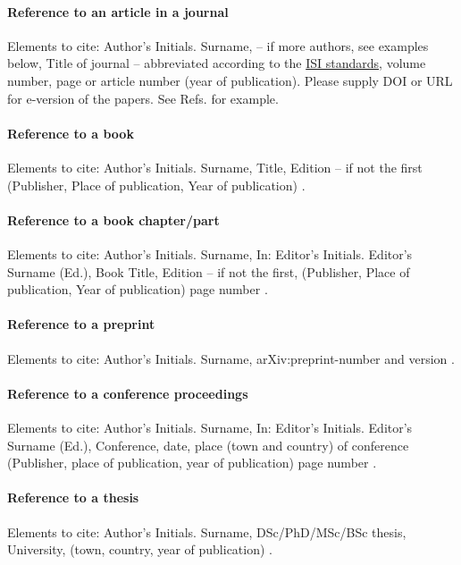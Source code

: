 \documentclass[CEJCS,PDF]{cej} %
\begin{document}
\paragraph{Reference to an article in a journal}
Elements to cite:
Author's Initials. Surname, -- if more authors, see examples below,
Title of journal -- abbreviated according to the \href{http://images.isiknowledge.com/WOK46/help/WOS/0-9_abrvjt.html}{ISI standards},
volume number, page or article number (year of publication).
Please supply DOI or URL for e-version of the papers.
See Refs. \cite{journal-1, journal-2, journal-3, journal-4, journal-5} for example.

\paragraph{Reference to a book}
Elements to cite:
Author's Initials. Surname,
Title,
Edition -- if not the first
(Publisher, Place of publication, Year of publication)
\cite{book-1, book-2}.


\paragraph{Reference to a book chapter/part}
Elements to cite:
Author's Initials. Surname,
In: Editor's Initials. Editor's Surname (Ed.),
Book Title,
Edition -- if not the first,
(Publisher, Place of publication, Year of publication)
page number \cite{chapter}.


\paragraph{Reference to a preprint}
Elements to cite:
Author's Initials. Surname,
arXiv:preprint-number and version \cite{arxiv-1}.

\paragraph{Reference to a conference proceedings}
Elements to cite:
Author's Initials. Surname,
In: Editor's Initials. Editor's Surname (Ed.),
Conference,
date, place (town and country) of conference
(Publisher, place of publication, year of publication)
page number \cite{proceedings}.


\paragraph{Reference to a thesis}
Elements to cite:
Author's Initials. Surname,
DSc/PhD/MSc/BSc thesis,
University,
(town, country, year of publication) \cite{thesis}.
\end{document}
